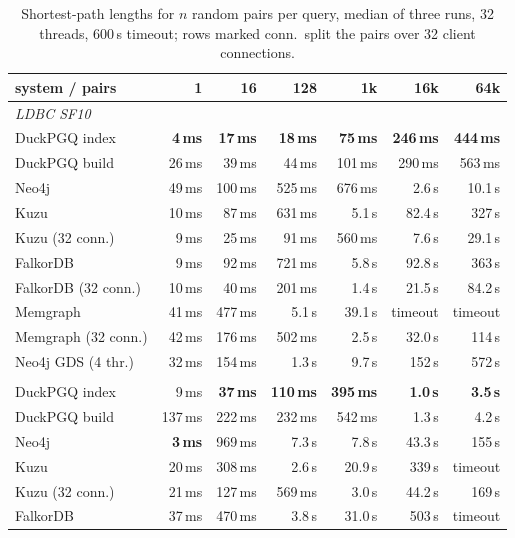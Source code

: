 \begin{table}[t]\centering\scriptsize\setlength{\tabcolsep}{2.6pt}
\caption{Shortest-path lengths for $n$ random pairs per query, median of three runs, 32 threads, 600\,s timeout; rows marked conn.\ split the pairs over 32 client connections.}\label{tab:random-pairs}
\begin{tabular}{lrrrrrr}\toprule
system / pairs & 1 & 16 & 128 & 1k & 16k & 64k \\ \midrule
\multicolumn{7}{l}{\textit{LDBC SF10}} \\
\quad DuckPGQ index & \textbf{4\,ms} & \textbf{17\,ms} & \textbf{18\,ms} & \textbf{75\,ms} & \textbf{246\,ms} & \textbf{444\,ms} \\
\quad DuckPGQ build & 26\,ms & 39\,ms & 44\,ms & 101\,ms & 290\,ms & 563\,ms \\
\quad Neo4j & 49\,ms & 100\,ms & 525\,ms & 676\,ms & 2.6\,s & 10.1\,s \\
\quad Kuzu & 10\,ms & 87\,ms & 631\,ms & 5.1\,s & 82.4\,s & 327\,s \\
\quad Kuzu (32 conn.) & 9\,ms & 25\,ms & 91\,ms & 560\,ms & 7.6\,s & 29.1\,s \\
\quad FalkorDB & 9\,ms & 92\,ms & 721\,ms & 5.8\,s & 92.8\,s & 363\,s \\
\quad FalkorDB (32 conn.) & 10\,ms & 40\,ms & 201\,ms & 1.4\,s & 21.5\,s & 84.2\,s \\
\quad Memgraph & 41\,ms & 477\,ms & 5.1\,s & 39.1\,s & timeout & timeout \\
\quad Memgraph (32 conn.) & 42\,ms & 176\,ms & 502\,ms & 2.5\,s & 32.0\,s & 114\,s \\
\quad Neo4j GDS (4 thr.) & 32\,ms & 154\,ms & 1.3\,s & 9.7\,s & 152\,s & 572\,s \\
\addlinespace
\multicolumn{7}{l}{\textit{LDBC SF100}} \\
\quad DuckPGQ index & 9\,ms & \textbf{37\,ms} & \textbf{110\,ms} & \textbf{395\,ms} & \textbf{1.0\,s} & \textbf{3.5\,s} \\
\quad DuckPGQ build & 137\,ms & 222\,ms & 232\,ms & 542\,ms & 1.3\,s & 4.2\,s \\
\quad Neo4j & \textbf{3\,ms} & 969\,ms & 7.3\,s & 7.8\,s & 43.3\,s & 155\,s \\
\quad Kuzu & 20\,ms & 308\,ms & 2.6\,s & 20.9\,s & 339\,s & timeout \\
\quad Kuzu (32 conn.) & 21\,ms & 127\,ms & 569\,ms & 3.0\,s & 44.2\,s & 169\,s \\
\quad FalkorDB & 37\,ms & 470\,ms & 3.8\,s & 31.0\,s & 503\,s & timeout \\

\end{tabular}
\end{table}
